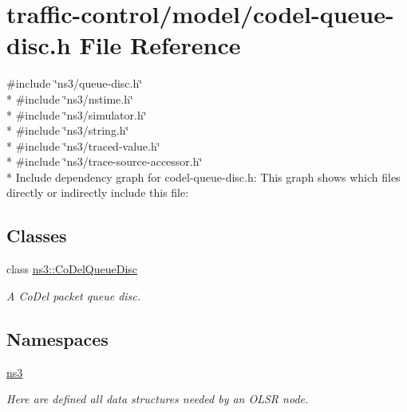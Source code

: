 \hypertarget{codel-queue-disc_8h}{}\section{traffic-\/control/model/codel-\/queue-\/disc.h File Reference}
\label{codel-queue-disc_8h}
{\ttfamily \#include \char`\"{}ns3/queue-\/disc.\+h\char`\"{}}\\*
{\ttfamily \#include \char`\"{}ns3/nstime.\+h\char`\"{}}\\*
{\ttfamily \#include \char`\"{}ns3/simulator.\+h\char`\"{}}\\*
{\ttfamily \#include \char`\"{}ns3/string.\+h\char`\"{}}\\*
{\ttfamily \#include \char`\"{}ns3/traced-\/value.\+h\char`\"{}}\\*
{\ttfamily \#include \char`\"{}ns3/trace-\/source-\/accessor.\+h\char`\"{}}\\*
Include dependency graph for codel-\/queue-\/disc.h\+:
This graph shows which files directly or indirectly include this file\+:
\subsection*{Classes}
\begin{DoxyCompactItemize}
\item 
class \hyperlink{classns3_1_1CoDelQueueDisc}{ns3\+::\+Co\+Del\+Queue\+Disc}
\begin{DoxyCompactList}\small\item\em A Co\+Del packet queue disc. \end{DoxyCompactList}\end{DoxyCompactItemize}
\subsection*{Namespaces}
\begin{DoxyCompactItemize}
\item 
 \hyperlink{namespacens3}{ns3}
\begin{DoxyCompactList}\small\item\em Here are defined all data structures needed by an O\+L\+SR node. \end{DoxyCompactList}\end{DoxyCompactItemize}
